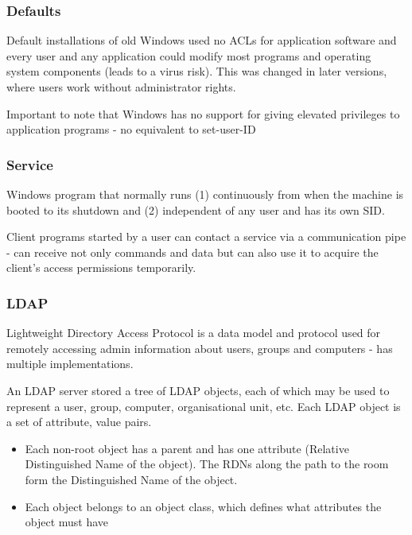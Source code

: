 \documentclass{article}
\begin{document}
\subsubsection{Defaults}
Default installations of old Windows used no ACLs for application software and every user and any application could modify most programs and operating system components (leads to a virus risk). This was changed in later versions, where users work without administrator rights. 

Important to note that Windows has no support for giving elevated privileges to application programs - no equivalent to set-user-ID

\subsubsection{Service}
Windows program that normally runs (1) continuously from when the machine is booted to its shutdown and (2) independent of any user and has its own SID.

Client programs started by a user can contact a service via a communication pipe - can receive not only commands and data but can also use it to acquire the client's access permissions temporarily.

\subsubsection{LDAP}
Lightweight Directory Access Protocol is a data model and protocol used for remotely accessing admin information about users, groups and computers - has multiple implementations.

An LDAP server stored a tree of LDAP objects, each of which may be used to represent a user, group, computer, organisational unit, etc. Each LDAP object is a set of attribute, value pairs. 
\begin{itemize}
	\item Each non-root object has a parent and has one attribute (Relative Distinguished Name of the object). The RDNs along the path to the room form the Distinguished Name of the object. 
	\item Each object belongs to an object class, which defines what attributes the object must have
\end{itemize}
\end{document}
